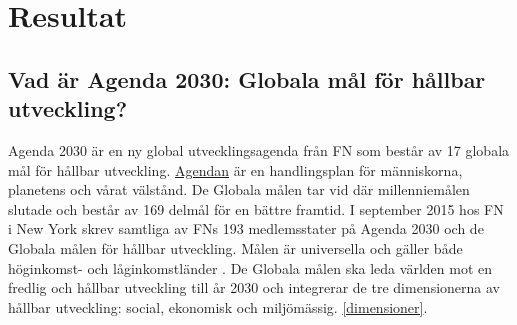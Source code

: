 \documentclass{report}
\begin{document}
\newpage 
\section{Resultat}
\subsection{Vad är Agenda 2030: Globala mål för hållbar utveckling?}
Agenda 2030 är en ny global utvecklingsagenda från FN som består av 17 globala mål för hållbar utveckling. \cite{webUNASweden} \href{https://sustainabledevelopment.un.org/content/documents/21252030%20Agenda%20for%20Sustainable%20Development%20web.pdf}{Agendan} är en handlingsplan för människorna, planetens och vårat välstånd. De Globala målen tar vid där millenniemålen slutade och består av 169 delmål för en bättre framtid. I september 2015 hos FN i New York skrev samtliga av FNs 193 medlemsstater på Agenda 2030 och de Globala målen för hållbar utveckling.\cite{webUNASweden} Målen är universella och gäller både höginkomst- och låginkomstländer \cite{webUNDP}. De Globala målen ska leda världen mot en fredlig och hållbar utveckling till år 2030 och integrerar de tre dimensionerna av hållbar utveckling: social, ekonomisk och miljömässig. \ref{dimensioner}. \cite{webUNASweden}\\
\end{document}
